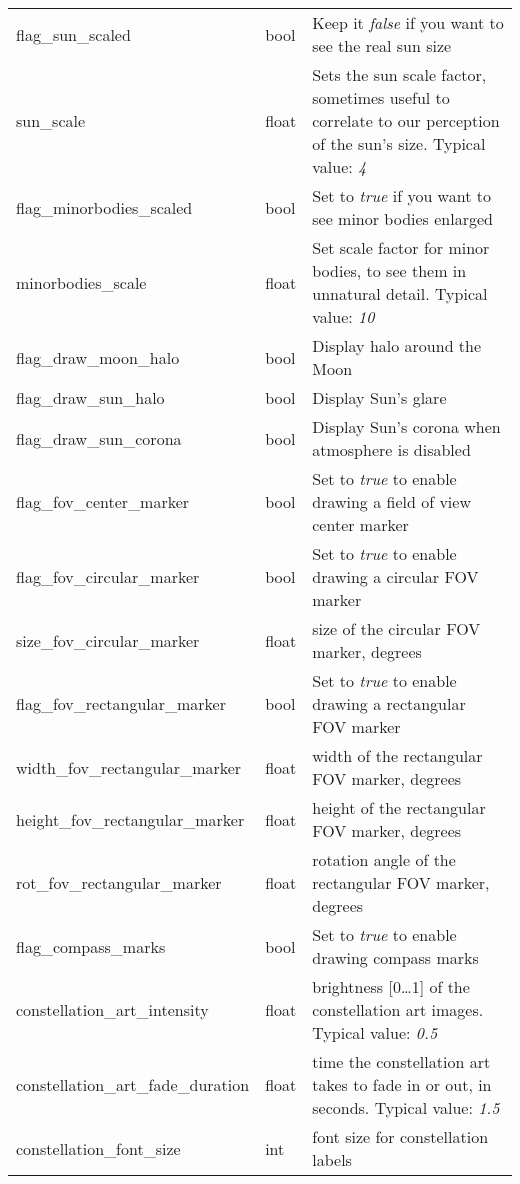 \begin{longtable}{l|l|p{77mm}}
flag\_sun\_scaled             & bool  & Keep it \emph{false} if you want to see the real sun size \\%
sun\_scale                    & float & Sets the sun scale factor, sometimes useful to correlate to our perception of the sun's size. Typical value: \emph{4}\\
flag\_minorbodies\_scaled     & bool  & Set to \emph{true} if you want to see minor bodies enlarged \\
minorbodies\_scale            & float & Set scale factor for minor bodies, to see them in unnatural detail. Typical value: \emph{10}\\
\midrule
flag\_draw\_moon\_halo           & bool  & Display halo around the Moon\\
flag\_draw\_sun\_halo            & bool  & Display Sun's glare\\
flag\_draw\_sun\_corona          & bool  & Display Sun's corona when atmosphere is disabled\\
\midrule
flag\_fov\_center\_marker        & bool  & Set to \emph{true} to enable drawing a field of view center marker \\
flag\_fov\_circular\_marker      & bool  & Set to \emph{true} to enable drawing a circular FOV marker \\
size\_fov\_circular\_marker      & float & size of the circular FOV marker, degrees \\
flag\_fov\_rectangular\_marker   & bool  & Set to \emph{true} to enable drawing a rectangular FOV marker \\
width\_fov\_rectangular\_marker  & float & width of the rectangular FOV marker, degrees \\
height\_fov\_rectangular\_marker & float & height of the rectangular FOV marker, degrees \\
rot\_fov\_rectangular\_marker    & float & rotation angle of the rectangular FOV marker, degrees \\
flag\_compass\_marks             & bool  & Set to \emph{true} to enable drawing compass marks \\
\midrule
constellation\_art\_intensity      & float & brightness [0\ldots1] of the constellation art images. Typical value: \emph{0.5}\\%
constellation\_art\_fade\_duration & float & time the constellation art takes to fade in or out, in seconds. Typical value: \emph{1.5}\\%
constellation\_font\_size          & int   & font size for constellation labels\\%

\end{longtable}
